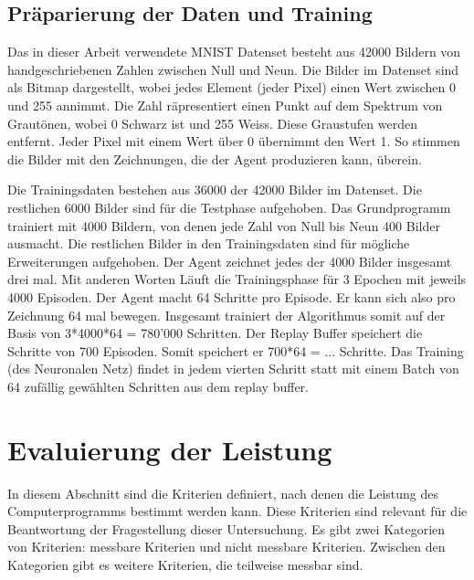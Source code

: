 
\subsection*{Präparierung der Daten und Training}
Das in dieser Arbeit verwendete MNIST Datenset besteht aus 42000 Bildern von
handgeschriebenen Zahlen zwischen Null und Neun. Die Bilder im Datenset sind als
Bitmap dargestellt, wobei jedes Element (jeder Pixel) einen Wert zwischen 0 und
255 annimmt. Die Zahl räpresentiert einen Punkt auf dem Spektrum von Grautönen,
wobei 0 Schwarz ist und 255 Weiss. Diese Graustufen werden entfernt. Jeder Pixel
mit einem Wert über 0 übernimmt den Wert 1. So stimmen die Bilder mit den
Zeichnungen, die der Agent produzieren kann, überein.

Die Trainingsdaten bestehen aus 36000 der 42000 Bilder im Datenset. Die
restlichen 6000 Bilder sind für die Testphase aufgehoben. Das Grundprogramm
trainiert mit 4000 Bildern, von denen jede Zahl von Null bis Neun 400 Bilder
ausmacht. Die restlichen Bilder in den Trainingsdaten sind für mögliche
Erweiterungen aufgehoben. Der Agent zeichnet jedes der 4000 Bilder insgesamt
drei mal. Mit anderen Worten Läuft die Trainingsphase für 3 Epochen mit jeweils
4000 Episoden. Der Agent macht 64 Schritte pro Episode. Er kann sich also pro
Zeichnung 64 mal bewegen. Insgesamt trainiert der Algorithmus somit auf der
Basis von 3*4000*64 = 780'000 Schritten. Der Replay Buffer speichert die
Schritte von 700 Episoden. Somit speichert er 700*64 = ... Schritte. Das
Training (des Neuronalen Netz) findet in jedem vierten Schritt statt mit einem
Batch von 64 zufällig gewählten Schritten aus dem replay buffer. 


\section{Evaluierung der Leistung}
In diesem Abschnitt sind die Kriterien definiert, nach denen die Leistung des
Computerprogramms bestimmt werden kann. Diese Kriterien sind relevant für die
Beantwortung der Fragestellung dieser Untersuchung. Es gibt zwei Kategorien von
Kriterien: messbare Kriterien und nicht messbare Kriterien. Zwischen den
Kategorien gibt es weitere Kriterien, die teilweise messbar sind.

